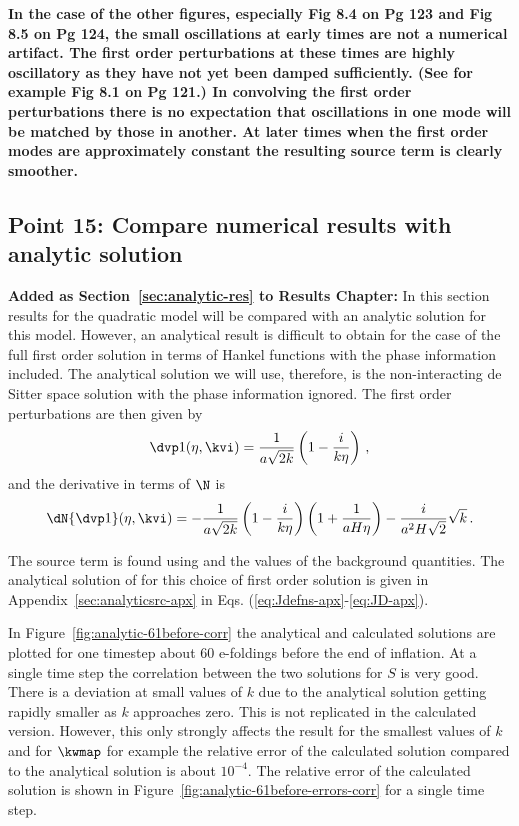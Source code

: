 \textbf{In the case of the other figures, especially Fig 8.4 on Pg 123 and Fig 8.5 on Pg 124, the
small oscillations at early times are not a numerical artifact. The first order perturbations at
these times are highly oscillatory as they have not yet been damped sufficiently. (See for example
Fig 8.1 on Pg 121.) In convolving the first order perturbations there is no expectation that
oscillations in one mode will be matched by those in another. At later times when the first order
modes are approximately constant the resulting source term is clearly smoother. 
}

\subsection{Point 15: Compare numerical results with analytic solution}

\textbf{Added as Section~\ref{sec:analytic-res} to Results Chapter:}
In this section results for the quadratic model will be compared with an analytic solution for this
model. However, an analytical result is difficult to obtain for the case of the full first
order solution in terms of Hankel functions with the phase information included. The analytical
solution we will use, therefore, is the non-interacting de Sitter
space solution with the phase information ignored. The first order perturbations are then given by
% 
\begin{equation}
 \dvp1(\eta, \kvi) = \frac{1}{a\sqrt{2 k}} \left( 1 - \frac{i}{k \eta}\right) \,,
\end{equation}
% 
and the derivative in terms of $\N$ is 
% 
\begin{equation}
 \dN{\dvp1}(\eta, \kvi) = -  \frac{1}{a\sqrt{2 k}} \left( 1 -
                        \frac{i}{k \eta}\right) \left(1 + \frac{1}{aH\eta}\right)
                         - \frac{i}{a^2 H \sqrt{2}}\sqrt{k}\,.
\end{equation}
% 

The source term is found using  and the values of the background
quantities. The analytical solution of  for this choice of first order
solution is given in Appendix~\ref{sec:analyticsrc-apx} in Eqs.
(\ref{eq:Jdefns-apx}-\ref{eq:JD-apx}).

In Figure~\ref{fig:analytic-61before-corr} the analytical and calculated solutions are plotted for
one timestep about 60 e-foldings before the end of inflation. At a single time step the correlation
between the two solutions for $S$ is very good. There is a deviation at small
values of $k$ due to the analytical solution getting rapidly smaller as $k$ approaches zero. This
 is not replicated in the calculated version. However, this only strongly affects the
result for the smallest values of $k$ and for $\kwmap$ for example the relative error of the
calculated solution compared to the analytical solution is about $10^{-4}$. The relative error of
the calculated solution is shown in Figure~\ref{fig:analytic-61before-errors-corr} for a single time
step.

